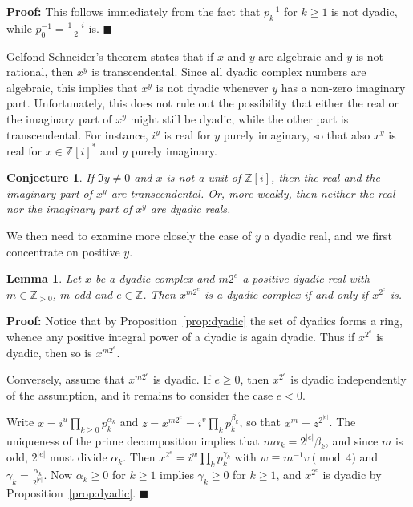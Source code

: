 \documentclass [11pt]{article}
\newcommand {\Z}{\mathbb Z}
\renewcommand {\geq}{\geqslant}
\newtheorem{lemma}[theorem]{Lemma}
\newtheorem{conj}[theorem]{Conjecture}
\newenvironment{proof}{\noindent \textbf {Proof:}}{{\hspace* {\fill}$\blacksquare$}}
\begin{document}
\begin {proof}
This follows immediately from the fact that $p_k^{-1}$ for $k \geq 1$ is not
dyadic, while $p_0^{-1} = \frac {1 - i}{2}$ is.
\end {proof}

Gelfond-Schneider's theorem states that if $x$ and $y$ are algebraic and
$y$ is not rational, then $x^y$ is transcendental.
Since all dyadic complex numbers are algebraic, this implies that $x^y$ is
not dyadic whenever $y$ has a non-zero imaginary part.
Unfortunately, this does not rule out the possibility that
either the real or the imaginary part of $x^y$ might still be dyadic,
while the other part is transcendental.
For instance, $i^y$ is real for $y$ purely imaginary, so that
also $x^y$ is real for $x \in \Z [i]^\ast$ and $y$ purely imaginary.

\begin {conj}
\label{conj}
If $\Im y \neq 0$ and $x$ is not a unit of $\Z [i]$, then
the real and the imaginary part of $x^y$ are transcendental.
Or, more weakly, then neither the real nor the imaginary
part of $x^y$ are dyadic reals.
\end {conj}

We then need to examine more closely the case of $y$ a dyadic real,
and we first concentrate on positive $y$.

\begin{lemma}
\label{lemma1}
Let $x$ be a dyadic complex and $m 2^e$ a positive dyadic real
with $m \in \Z_{>0}$, $m$ odd and $e \in \Z$.
Then $x^{m 2^e}$ is a dyadic complex if and only if $x^{2^e}$ is.
\end{lemma}

\begin{proof}
Notice that by Proposition~\ref {prop:dyadic} the set of dyadics forms
a ring, whence any positive integral power of a dyadic is again dyadic.
Thus if $x^{2^e}$ is dyadic, then so is $x^{m 2^e}$.

Conversely, assume that $x^{m 2^e}$ is dyadic. If $e \geq 0$,
then $x^{2^e}$ is dyadic independently of the assumption,
and it remains to consider the case $e < 0$.

Write $x = i^u \prod_{k \geq 0} p_k^{\alpha_k}$
and $z = x^{m 2^e} = i^v \prod_k p_k^{\beta_k}$, so that $x^m = z^{2^{|e|}}$.
The uniqueness of the prime decomposition implies that
$m \alpha_k = 2^{|e|} \beta_k$, and since $m$ is odd, $2^{|e|}$ must
divide $\alpha_k$. Then
$x^{2^e} = i^w \prod_k p_k^{\gamma_k}$ with $w \equiv m^{-1} v \pmod 4$ and
$\gamma_k = \frac {\alpha_k}{2^{|e|}}$.
Now $\alpha_k \geq 0$ for $k \geq 1$ implies $\gamma_k \geq 0$ for $k \geq 1$,
and $x^{2^e}$ is dyadic by Proposition~\ref {prop:dyadic}.
\end{proof}
\end{document}
